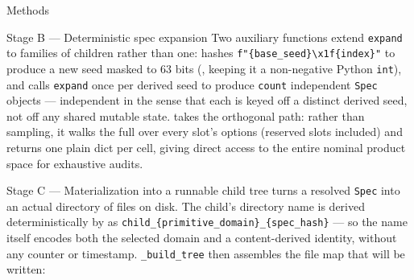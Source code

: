 \documentclass[
  ignorenonframetext,
]{beamer}
\begin{document}
\begin{frame}{Methods}
\begin{block}{Stage B --- Deterministic spec expansion}
Two auxiliary functions extend \texttt{expand} to families of children
rather than one:  hashes
\texttt{f"\{base\_seed\}\textbackslash{}x1f\{index\}"} to produce a new
seed masked to 63 bits (, keeping it a
non-negative Python \texttt{int}), and
 calls \texttt{expand}
once per derived seed to produce \texttt{count} independent
\texttt{Spec} objects --- independent in the sense that each is keyed
off a distinct derived seed, not off any shared mutable state.
 takes the orthogonal path: rather than
sampling, it walks the full  over every slot's
options (reserved slots included) and returns one plain dict per cell,
giving direct access to the entire nominal product space for exhaustive
audits.
\end{block}

\begin{block}{Stage C --- Materialization into a runnable child tree}
\protect{}\label{stage-c-materialization-into-a-runnable-child-tree}
turns a resolved \texttt{Spec} into an actual directory of files on
disk. The child's directory name is derived deterministically by
 as
\texttt{child\_\{primitive\_domain\}\_\{spec\_hash\}} --- so the name
itself encodes both the selected domain and a content-derived identity,
without any counter or timestamp. \texttt{\_build\_tree} then assembles
the file map that will be written:


\end{block}
\end{frame}
\end{document}
